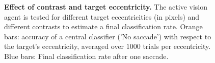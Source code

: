 \begin{figure}[t!]%
	\caption{
		{\bf Effect of contrast and target eccentricity.} %
		The active vision agent is tested for different target eccentricities (in pixels) and different contrasts to estimate a final classification rate. Orange bars: accuracy of a central classifier ('No saccade') with respect to the target's eccentricity, averaged over $1000$ trials per eccentricity. Blue bars: Final classification rate after one saccade. %
		\label{fig:results}}%
\end{figure}%




